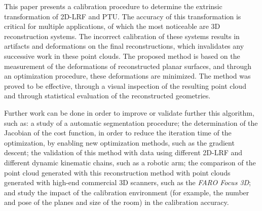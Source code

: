 \documentclass[conference]{IEEEtran}
\begin{document}
This paper presents a calibration procedure to determine the extrinsic transformation of 2D-LRF and PTU. The accuracy of this transformation is critical for multiple applications, of which the most noticeable are 3D reconstruction systems. The incorrect calibration of these systems results in artifacts and deformations on the final reconstructions, which invalidates any successive work in these point clouds. The proposed method is based on the measurement of the deformations of reconstructed planar surfaces, and through an optimization procedure, these deformations are minimized. The method was proved to be effective, through a visual inspection of the resulting point cloud and through statistical evaluation of the reconstructed geometries.

Further work can be done in order to improve or validate further this algorithm, such as: a study of a automatic segmentation procedure; the determination of the Jacobian of the cost function, in order to reduce the iteration time of the optimization, by enabling new optimization methods, such as the gradient descent; the validation of this method with data using different 2D-LRF and different dynamic kinematic chains, such as a robotic arm; the comparison of the point cloud generated with this reconstruction method with point clouds generated with high-end commercial 3D scanners, such as the \textit{FARO Focus 3D}; and study the impact of the calibration environment (for example, the number and pose of the planes and size of the room) in the calibration accuracy.




\end{document}
